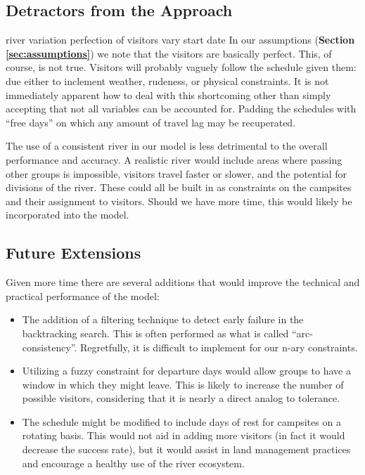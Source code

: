\documentclass[11pt]{article} %
\begin{document}
\subsection{Detractors from the Approach}
\label{sec:cons}
river variation
perfection of visitors
vary start date
In our assumptions (\textbf{Section \ref{sec:assumptions}}) we note that the
visitors are basically perfect.  This, of course, is not true.  Visitors will
probably vaguely follow the schedule given them: due either to inclement
weather, rudeness, or physical constraints.  It is not immediately apparent
how to deal with this shortcoming other than simply accepting that not all
variables can be accounted for.  Padding the schedules with ``free days'' on
which any amount of travel lag may be recuperated.

The use of a consistent river in our model is less detrimental to the
overall performance and accuracy.  A realistic river would include areas
where passing other groups is impossible, visitors travel faster or slower,
and the potential for divisions of the river.  These could all be built in
as constraints on the campsites and their assignment to visitors.  Should
we have more time, this would likely be incorporated into the model.


\subsection{Future Extensions}
\label{sec:extensions}
Given more time there are several additions that would improve the technical
and practical performance of the model:
\begin{itemize}
\item The addition of a filtering technique to detect early failure in the
backtracking search.  This is often performed as what is called
``arc-consistency''.  Regretfully, it is difficult to implement for our
n-ary constraints.
\item Utilizing a fuzzy constraint for departure days would allow groups
to have a window in which they might leave.  This is likely to increase the
number of possible visitors, considering that it is nearly a direct analog
to tolerance.
\item The schedule might be modified to include days of rest for campsites
on a rotating basis.  This would not aid in adding more visitors (in fact it
would decrease the success rate), but it would assist in land management
practices and encourage a healthy use of the river ecosystem.
\end{itemize}
\end{document}
